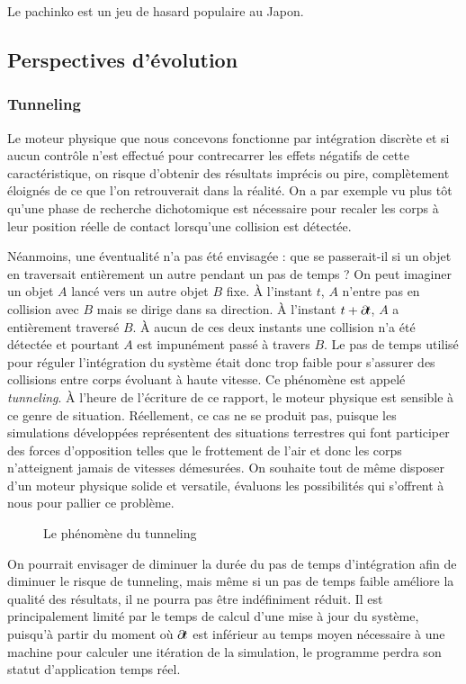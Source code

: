 Le pachinko est un jeu de hasard populaire au Japon. 

\subsection{Perspectives d'évolution}

\subsubsection{Tunneling}

Le moteur physique que nous concevons fonctionne par intégration
discrète et si aucun contrôle n'est effectué pour contrecarrer les
effets négatifs de cette caractéristique, on risque d'obtenir des
résultats imprécis ou pire, complètement éloignés de ce que l'on
retrouverait dans la réalité. On a par exemple vu plus tôt qu'une
phase de recherche dichotomique est nécessaire pour recaler les corps
à leur position réelle de contact lorsqu'une collision est détectée.

Néanmoins, une éventualité n'a pas été envisagée : que se passerait-il
si un objet en traversait entièrement un autre pendant un pas de temps
? On peut imaginer un objet $A$ lancé vers un autre objet $B$
fixe. \`A l'instant $t$, $A$ n'entre pas en collision avec $B$ mais se
dirige dans sa direction. \`A l'instant $t + \partial \! t$, $A$ a
entièrement traversé $B$. \`A aucun de ces deux instants une collision
n'a été détectée et pourtant $A$ est impunément passé à travers
$B$. Le pas de temps utilisé pour réguler l'intégration du système
était donc trop faible pour s'assurer des collisions entre corps
évoluant à haute vitesse. Ce phénomène est appelé
\textit{tunneling}. \`A l'heure de l'écriture de ce rapport, le moteur
physique est sensible à ce genre de situation. Réellement, ce cas ne
se produit pas, puisque les simulations développées représentent des
situations terrestres qui font participer des forces d'opposition
telles que le frottement de l'air et donc les corps n'atteignent
jamais de vitesses démesurées. On souhaite tout de même disposer d'un
moteur physique solide et versatile, évaluons les possibilités qui
s'offrent à nous pour pallier ce problème.
\begin{figure}
  \centering
  
  \caption{Le phénomène du tunneling}
  \label{tunneling1}
\end{figure}

On pourrait envisager de diminuer la durée du pas de temps
d'intégration afin de diminuer le risque de tunneling, mais même si un
pas de temps faible améliore la qualité des résultats, il ne pourra
pas être indéfiniment réduit. Il est principalement limité par le
temps de calcul d'une mise à jour du système, puisqu'à partir du
moment o\`u $\partial \! t$ est inférieur au temps moyen nécessaire à une
machine pour calculer une itération de la simulation, le programme
perdra son statut d'application temps réel.

